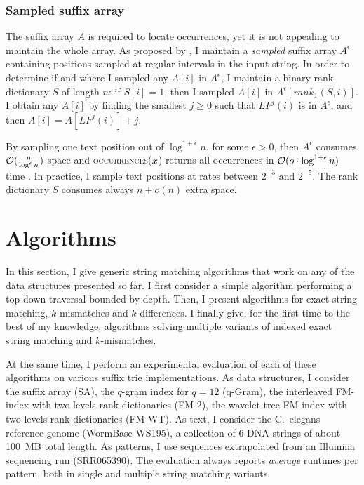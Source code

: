 \subsubsection{Sampled suffix array}

The suffix array $A$ is required to locate occurrences, yet it is not appealing to maintain the whole array.
As proposed by \citeauthor{Ferragina2000}, I maintain a \emph{sampled} suffix array $A^{\epsilon}$ containing positions sampled at regular intervals in the input string.
In order to determine if and where I sampled any $A[i]$ in $A^{\epsilon}$, I maintain a binary rank dictionary $S$ of length $n$: if $S[i]=1$, then I sampled $A[i]$ in $A^{\epsilon}[rank_1(S,i)]$.
I obtain any $A[i]$ by finding the smallest $j \geq 0$ such that $LF^j(i)$ is in $A^{\epsilon}$, and then $A[i] = A[LF^j(i)] + j$.

By sampling one text position out of $\log^{1+\epsilon}{n}$, for some $\epsilon > 0$, then $A^{\epsilon}$ consumes $\mathcal{O}(\frac{n}{\log^{\epsilon}{n}})$ space and \textsc{occurrences}($x$) returns all occurrences in $\mathcal{O}(o \cdot \log^{1+\epsilon}{n})$ time \citep{Ferragina2000}.
In practice, I sample text positions at rates between $2^{-3}$ and $2^{-5}$.
The rank dictionary $S$ consumes always $n+o(n)$ extra space.

\section{Algorithms}
\label{sec:index:algo}

In this section, I give generic string matching algorithms that work on any of the data structures presented so far.
I first consider a simple algorithm performing a top-down traversal bounded by depth.
Then, I present algorithms for exact string matching, $k$-mismatches and $k$-differences.
I finally give, for the first time to the best of my knowledge, algorithms solving multiple variants of indexed exact string matching and $k$-mismatches.

At the same time, I perform an experimental evaluation of each of these algorithms on various suffix trie implementations.
As data structures, I consider the suffix array (SA), the $q$-gram index for $q=12$ (q-Gram), the interleaved FM-index with two-levels rank dictionaries (FM-2), the wavelet tree FM-index with two-levels rank dictionaries (FM-WT).
As text, I consider the C.~elegans reference genome (WormBase WS195), \ie a collection of 6 DNA strings of about 100~MB total length.
As patterns, I use sequences extrapolated from an Illumina sequencing run (SRR065390).
The evaluation always reports \emph{average} runtimes per pattern, both in single and multiple string matching variants.

